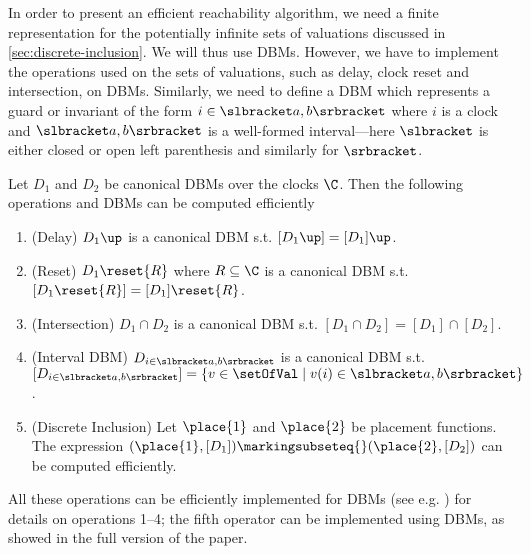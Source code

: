 In order to present an efficient reachability algorithm, we need a finite representation for the potentially infinite sets of valuations discussed in \cref{sec:discrete-inclusion}. We will thus use DBMs. However, we have to implement the operations used on the sets of valuations, such as delay, clock reset and intersection, on DBMs. Similarly, we need to define a DBM which represents a guard or invariant of the form $i \in \slbracket a, b \srbracket$ where $i$ is a clock and $\slbracket a, b \srbracket$ is a well-formed interval---here 
$\slbracket$ is either closed or open left parenthesis and
similarly for $\srbracket$.

\begin{proposition}
Let $D_1$ and $D_2$ be canonical DBMs over the clocks $\C$. Then the following operations and DBMs can be computed efficiently
\begin{enumerate}
\item (Delay) $D_1\up$ is a canonical DBM s.t. $[D_1\up] = [D_1]\up$.
\item (Reset) $D_1\reset{R}$ where $R \subseteq \C$ is a canonical DBM s.t. $[D_1\reset{R}] = [D_1]\reset{R}$.
\item (Intersection) $D_1 \cap D_2$ is a canonical DBM s.t. $[D_1 \cap D_2] = [D_1] \cap [D_2]$.
\item (Interval DBM) $D_{i \in \slbracket a,b \srbracket}$ is a canonical DBM s.t. $[D_{i \in \slbracket a,b \srbracket}] = \{ v \in \setOfVal \mid v(i) \in \slbracket a,b \srbracket \}$.
\item (Discrete Inclusion) Let $\place{1}$ and $\place{2}$ be placement functions. The expression $(\place{1}, [D_1]) \markingsubseteq{} (\place{2}, [D_2])$ can be computed efficiently.
\end{enumerate}
\end{proposition}
All these operations can be efficiently implemented for 
DBMs (see e.g. \cite{pettersson_phd, DBLP:conf/ac/BengtssonY03})
for details on operations 1--4; the fifth operator can be implemented using 
DBMs, as showed in the full version of the paper.



